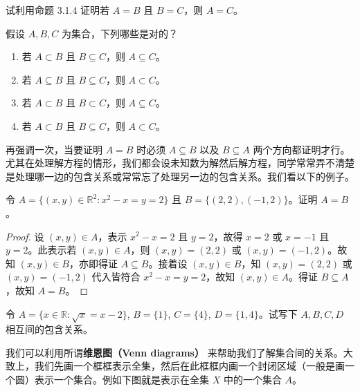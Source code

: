 \begin{question}
试利用命题 3.1.4 证明若 $A = B$ 且 $B = C$，则 $A = C$。
\end{question}

\begin{question}
假设 $A, B, C$ 为集合，下列哪些是对的？
\begin{enumerate}[label={(\arabic*)}]
  \item 若 $A \subset B$ 且 $B \subseteq C$，则 $A \subseteq C$。
  \item 若 $A \subseteq B$ 且 $B \subseteq C$，则 $A \subset C$。
  \item 若 $A \subset B$ 且 $B \subset C$，则 $A \subseteq C$。
  \item 若 $A \subset B$ 且 $B \subseteq C$，则 $A \subset C$。
\end{enumerate}
\end{question}

再强调一次，当要证明 $A = B$ 时必须 $A \subseteq B$ 以及 $B \subseteq A$ 两个方向都证明才行。尤其在处理解方程的情形，我们都会设未知数为解然后解方程，同学常常弄不清楚是处理哪一边的包含关系或常常忘了处理另一边的包含关系。我们看以下的例子。

\begin{example}
令 $A = \{(x, y) \in \mathbb{R}^2 : x^2 - x = y = 2\}$ 且 $B = \{(2, 2), (-1, 2)\}$。证明 $A = B$。

\begin{proof}
设 $(x, y) \in A$，表示 $x^2 - x = 2$ 且 $y = 2$，故得 $x = 2$ 或 $x = -1$ 且 $y = 2$。此表示若 $(x, y) \in A$，则 $(x, y) = (2, 2)$ 或 $(x, y) = (-1, 2)$。故知 $(x, y) \in B$，亦即得证 $A \subseteq B$。接着设 $(x, y) \in B$，知 $(x, y) = (2, 2)$ 或 $(x, y) = (-1, 2)$ 代入皆符合 $x^2 - x = y = 2$，故知 $(x, y) \in A$。得证 $B \subseteq A$，故知 $A = B$。
\end{proof}
\end{example}

\begin{question}
令 $A = \{x \in \mathbb{R} : \sqrt{x} = x - 2\}$, $B = \{1\}$, $C = \{4\}$, $D = \{1, 4\}$。试写下 $A, B, C, D$ 相互间的包含关系。
\end{question}

我们可以利用所谓\textbf{维恩图（Venn diagrams）} 来帮助我们了解集合间的关系。大致上，我们先画一个框框表示全集，然后在此框框内画一个封闭区域（一般是画一个圆）表示一个集合。例如下图就是表示在全集 $X$ 中的一个集合 $A$。
\begin{figure}[H]
  \centering
\end{figure}

